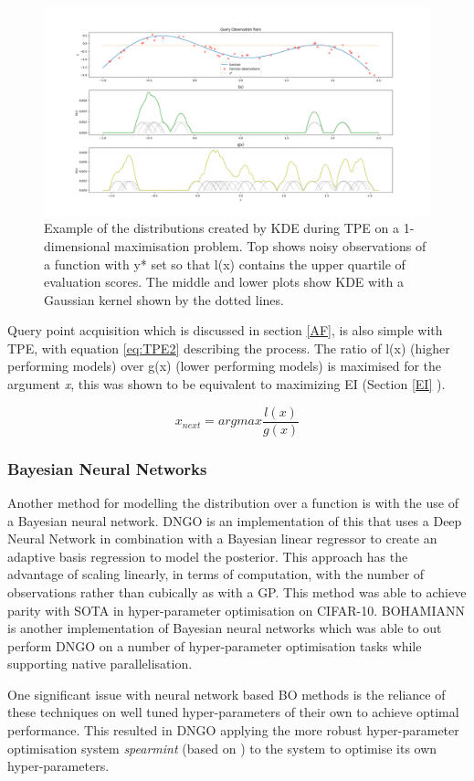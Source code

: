 \documentclass{article}
\begin{document}
			\begin{figure}[h]

			\includegraphics[trim=20 0 0 0 ,scale=0.25]{TPE1.png}

			\caption{Example of the distributions created by KDE during TPE on a 1-dimensional maximisation problem. Top shows noisy observations of a function with y* set so that l(x) contains the upper quartile of evaluation scores. The middle and lower plots show KDE with a Gaussian kernel shown by the dotted lines.}
			\label{fig:tpe1}
			\end{figure}

			Query point acquisition which is discussed in section \ref{AF}, is also simple with TPE, with equation \ref{eq:TPE2} describing the process. The ratio of l(x) (higher performing models) over g(x) (lower performing models) is maximised for the argument \textit{x}, this was shown to be equivalent to maximizing EI \cite{20} (Section \ref{EI} ).

			\begin{equation}\label{eq:TPE2} x_{next} = argmax \frac{l(x)}{g(x)}\end{equation}


		\subsubsection{Bayesian Neural Networks}

			Another method for modelling the distribution over a function is with the use of a Bayesian neural network. DNGO \cite{22} is an implementation of this that uses a Deep Neural Network in combination with a Bayesian linear regressor to create an adaptive basis regression to model the posterior. This approach has the advantage of scaling linearly, in terms of computation, with the number of observations rather than cubically as with a GP. This method was able to achieve parity with SOTA in hyper-parameter optimisation on CIFAR-10. BOHAMIANN \cite{40} is another implementation of Bayesian neural networks which was able to out perform DNGO on a number of hyper-parameter optimisation tasks while supporting native parallelisation. 
			\par
			One significant issue with neural network based BO methods is the reliance of these techniques on well tuned hyper-parameters of their own to achieve optimal performance. This resulted in DNGO applying the more robust hyper-parameter optimisation system \textit{spearmint} (based on \cite{20}) to the system to optimise its own hyper-parameters.
\end{document}
